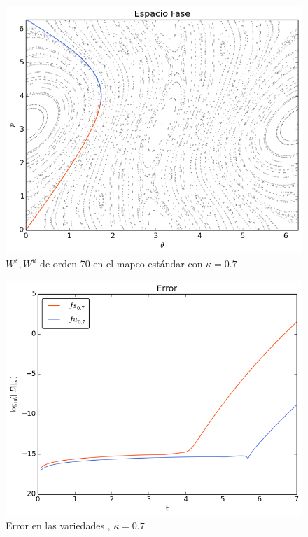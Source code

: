 \begin{figure}[H]
\centering
\includegraphics[scale=0.6]{estandark07}
\caption{$W^{s},W^{u}$ de orden 70 en el mapeo estándar con $\kappa=0.7$}
\label{estandar07}
\end{figure}

\begin{figure}[H]
\centering
\includegraphics[scale=0.6]{error_est_k07} 
\caption{Error en las variedades , $\kappa=0.7$}
\label{error est k07}
\end{figure}


